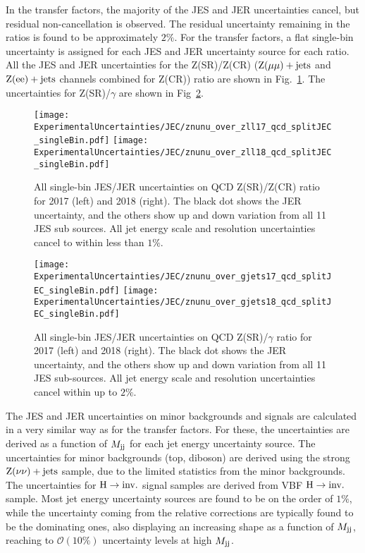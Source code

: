 In the transfer factors, the majority of the JES and JER uncertainties cancel, but residual non-cancellation is observed. The residual uncertainty 
remaining in the ratios is found to be approximately $2\%$. For the transfer factors, a flat single-bin uncertainty is assigned for each
JES and JER uncertainty source for each ratio. All the JES and JER uncertainties for 
the Z(SR)/Z(CR) ($\mathrm{Z}(\mu\mu)+\textrm{jets}$ and $\mathrm{Z}(\textrm{ee})+\textrm{jets}$ channels combined for Z(CR)) ratio are shown in Fig.~\ref{fig:znunu_over_zll_jes_jer_uncs}. 
The uncertainties for Z(SR)/$\gamma$ are shown in Fig~\ref{fig:znunu_over_gjets_jes_jer_uncs}. 

\begin{figure}[h!]
  \centering
  \texttt{[image: ExperimentalUncertainties/JEC/znunu\_over\_zll17\_qcd\_splitJEC\_singleBin.pdf]}
  \texttt{[image: ExperimentalUncertainties/JEC/znunu\_over\_zll18\_qcd\_splitJEC\_singleBin.pdf]}
  \caption{All single-bin JES/JER uncertainties on QCD Z(SR)/Z(CR) ratio for 2017 (left) and 2018 (right). 
    The black dot shows the JER uncertainty, and the others show up and down variation from all 11 JES sub sources. 
    All jet energy scale and resolution uncertainties cancel to within less than $1\%$.
  }
  \label{fig:znunu_over_zll_jes_jer_uncs}
\end{figure}

\begin{figure}[h!]
  \centering
  \texttt{[image: ExperimentalUncertainties/JEC/znunu\_over\_gjets17\_qcd\_splitJEC\_singleBin.pdf]}
  \texttt{[image: ExperimentalUncertainties/JEC/znunu\_over\_gjets18\_qcd\_splitJEC\_singleBin.pdf]}
  \caption{All single-bin JES/JER uncertainties on QCD Z(SR)/$\gamma$ ratio for 2017 (left) and 2018 (right). 
    The black dot shows the JER uncertainty, and the others show up and down variation from all 11 JES sub-sources. 
    All jet energy scale and resolution uncertainties cancel within up to $2\%$.
  }
  \label{fig:znunu_over_gjets_jes_jer_uncs}
\end{figure}

The JES and JER uncertainties on minor backgrounds and signals are calculated in a very similar way as for the transfer factors. 
For these, the uncertainties are derived as a function of $M_{\textrm{jj}}$ for each jet energy uncertainty source. The uncertainties for minor backgrounds (top, diboson)
are derived using the strong $\textrm{Z}(\nu\nu)+\textrm{jets}$ sample, due to the limited statistics from the minor backgrounds. The uncertainties for $\textrm{H} \rightarrow \textrm{inv.}$ signal samples 
are derived from VBF $\textrm{H} \rightarrow \textrm{inv.}$ sample.
Most jet energy uncertainty sources are found to be on the order of $1\%$, while the uncertainty coming from the relative corrections are typically
found to be the dominating ones, also displaying an increasing shape as a function of $M_{\textrm{jj}}$, reaching to $\mathcal{O}(10\%)$ uncertainty levels at high $M_{\textrm{jj}}$.

